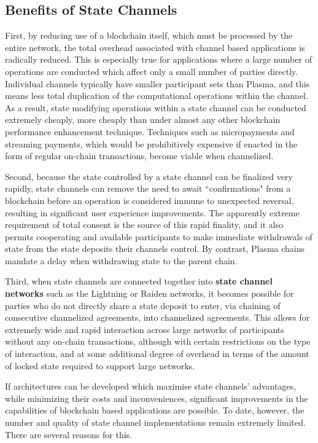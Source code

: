 \documentclass[prb,floatfix,reprint,nofootinbib,amsmath,amssymb,epsfig,pre,floats,letterpaper,groupedaffiliation,tightenlines,allcolors=blue,11pt]{revtex4}
\theoremstyle{definition}
\theoremstyle{definition}
\theoremstyle{definition}
\begin{document}
\subsection{Benefits of State Channels}

First, by reducing use of a blockchain itself, which must be processed by the entire network, the total overhead associated with channel based applications is radically reduced. This is especially true for applications where a large number of operations are conducted which affect only a small number of parties directly. Individual channels typically have smaller participant sets than Plasma, and this means less total duplication of the computational operations within the channel. As a result, state modifying operations within a state channel can be conducted extremely cheaply, more cheaply than under almost any other blockchain performance enhancement technique. Techniques such as micropayments and streaming payments, which would be prohibitively expensive if enacted in the form of regular on-chain transactions, become viable when channelized.

Second, because the state controlled by a state channel can be finalized very rapidly, state channels can remove the need to await ``confirmations" from a blockchain before an operation is considered immune to unexpected reversal, resulting in significant user experience improvements. The apparently extreme requirement of total consent is the source of this rapid finality, and it also permits cooperating and available participants to make immediate withdrawals of state from the state deposits their channels control. By contrast, Plasma chains mandate a delay when withdrawing state to the parent chain.

Third, when state channels are connected together into \textbf{state channel networks} such as the Lightning \cite{Poon_2016} or Raiden \cite{readthedocs:raidenspec} networks, it becomes possible for parties who do not directly share a state deposit to enter, via chaining of consecutive channelized agreements, into channelized agreements. This allows for extremely wide and rapid interaction across large networks of participants without any on-chain transactions, although with certain restrictions on the type of interaction, and at some additional degree of overhead in terms of the amount of locked state required to support large networks.

If architectures can be developed which maximise state channels' advantages, while minimizing their costs and inconveniences, significant improvements in the capabilities of blockchain based applications are possible. To date, however, the number and quality of state channel implementations remain extremely limited.  There are several reasons for this.
\end{document}
